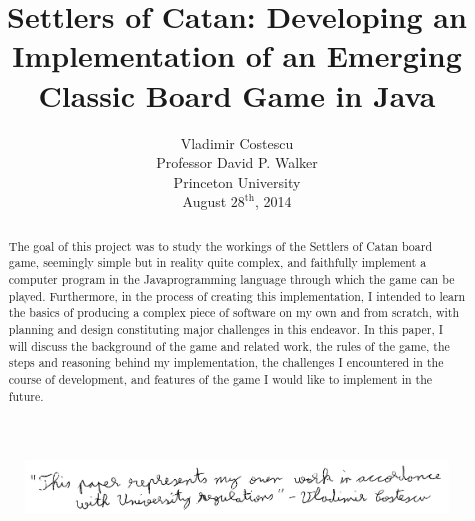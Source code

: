 \documentclass[pageno]{jpaper}
\begin{document}
\lstset{language=Java,basicstyle=\ttfamily}

\title{
Settlers of Catan: Developing an Implementation of an Emerging Classic Board Game in Java}
\date{}

\author{Vladimir Costescu \\ Professor David P. Walker \\ Princeton University \\ August $28^{\text{th}}$, 2014}
\maketitle
\vspace*{\fill}
\begin{figure}
\centering
\includegraphics[width=150mm]{honor_code.png}
\end{figure}
\thispagestyle{empty} %

\newpage
\tableofcontents
\thispagestyle{empty}
\newpage

\begin{abstract}
The goal of this project was to study the workings of the Settlers of Catan\textsuperscript{\textregistered} board game, seemingly simple but in reality quite complex, and faithfully implement a computer program in the Java\texttrademark programming language through which the game can be played. Furthermore, in the process of creating this implementation, I intended to learn the basics of producing a complex piece of software on my own and from scratch, with planning and design constituting major challenges in this endeavor. In this paper, I will discuss the background of the game and related work, the rules of the game, the steps and reasoning behind my implementation, the challenges I encountered in the course of development, and features of the game I would like to implement in the future.
\end{abstract}
\end{document}
